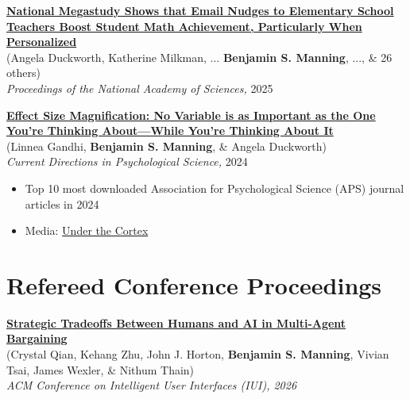 \documentclass[margin,line,pifont,palatino,courier, 9pt]{res}
\begin{document}
\begin{resume}
\href{https://www.pnas.org/doi/10.1073/pnas.2418616122}{\bf National Megastudy Shows that Email Nudges to Elementary School Teachers Boost Student Math Achievement, Particularly When Personalized}\\
(Angela Duckworth\footnotemark[\value{footnote}], Katherine Milkman, ... \textbf{Benjamin S. Manning}, ..., \& 26 others)\\
\textit{Proceedings of the National Academy of Sciences,} 2025

\href{https://journals.sagepub.com/doi/full/10.1177/09637214241268222}{\bf Effect Size Magnification: No Variable is as Important as the One You're Thinking About---While You're Thinking About It}\\
(Linnea Gandhi\footnotemark[\value{footnote}], \textbf{Benjamin S. Manning}, \& Angela Duckworth)\\
\textit{Current Directions in Psychological Science,} 2024
\vspace{0.25cm}
\begin{itemize}
\item Top 10 most downloaded Association for Psychological Science (APS) journal articles in 2024
\item Media: \href{https://podcasts.apple.com/us/podcast/2024-in-review-10-most-popular-articles-from-aps-journals/id1533660085?i=1000683292869}{Under the Cortex}
\end{itemize}

\section{\sc Refereed Conference Proceedings }

\href{https://dl.acm.org/doi/10.1145/3742413.3789078}{\bf Strategic Tradeoffs Between Humans and AI in Multi-Agent Bargaining}\\
(Crystal Qian\footnotemark[\value{footnote}], Kehang Zhu\footnotemark[\value{footnote}], John J. Horton, \textbf{Benjamin S. Manning}, Vivian Tsai, James Wexler, \& Nithum Thain)\\
\textit{ACM Conference on Intelligent User Interfaces (IUI), 2026}


\end{resume}
\end{document}
